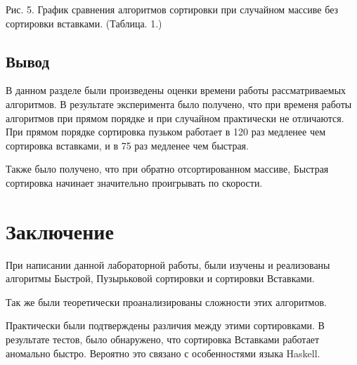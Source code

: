 \documentclass[12pt]{report}
\begin{document}
\begin{center}
	\begin{center}
	\end{center}
	Рис. 5. График сравнения алгоритмов сортировки при случайном массиве без сортировки вставками. (Таблица. 1.)
\end{center}

\section*{Вывод}

В данном разделе были произведены оценки времени работы рассматриваемых алгоритмов. В результате эксперимента было получено, что при временя работы алгоритмов при прямом порядке и при случайном практически не отличаются. При прямом порядке сортировка пузьком работает в 120 раз медленее чем сортировка вставками, и в 75 раз медленее чем быстрая.

Также было получено, что при обратно отсортированном массиве, Быстрая сортировка начинает значительно проигрывать по скорости.

\chapter*{Заключение}

При написании данной лабораторной работы, были изучены и реализованы алгоритмы Быстрой, Пузырьковой сортировки и сортировки Вставками.

Так же были теоретически проанализированы сложности этих алгоритмов.

Практически были подтверждены различия между этими сортировками.
В результате тестов, было обнаружено, что сортировка Вставками работает аномально быстро.
Вероятно это связано с особенностями языка Haskell.
\end{document}
